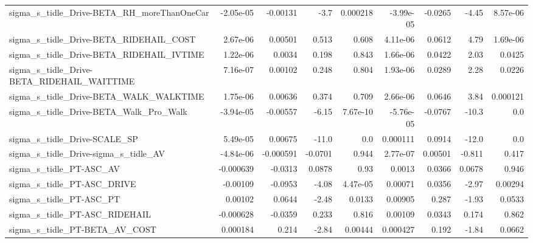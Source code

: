 \begin{tabular}{lrrrrrrrr}
sigma\_s\_tidle\_Drive-BETA\_RH\_moreThanOneCar         &   -2.05e-05 &     -0.00131 &      -3.7 & 0.000218 &  -3.99e-05 &     -0.0265 &        -4.45 &      8.57e-06 \\
sigma\_s\_tidle\_Drive-BETA\_RIDEHAIL\_COST             &    2.67e-06 &      0.00501 &     0.513 &    0.608 &   4.11e-06 &      0.0612 &         4.79 &      1.69e-06 \\
sigma\_s\_tidle\_Drive-BETA\_RIDEHAIL\_IVTIME           &    1.22e-06 &       0.0034 &     0.198 &    0.843 &   1.66e-06 &      0.0422 &         2.03 &        0.0425 \\
sigma\_s\_tidle\_Drive-BETA\_RIDEHAIL\_WAITTIME         &    7.16e-07 &      0.00102 &     0.248 &    0.804 &   1.93e-06 &      0.0289 &         2.28 &        0.0226 \\
sigma\_s\_tidle\_Drive-BETA\_WALK\_WALKTIME             &    1.75e-06 &      0.00636 &     0.374 &    0.709 &   2.66e-06 &      0.0646 &         3.84 &      0.000121 \\
sigma\_s\_tidle\_Drive-BETA\_Walk\_Pro\_Walk             &   -3.94e-05 &     -0.00557 &     -6.15 & 7.67e-10 &  -5.76e-05 &     -0.0767 &        -10.3 &           0.0 \\
sigma\_s\_tidle\_Drive-SCALE\_SP                       &    5.49e-05 &      0.00675 &     -11.0 &      0.0 &   0.000111 &      0.0914 &        -12.0 &           0.0 \\
sigma\_s\_tidle\_Drive-sigma\_s\_tidle\_AV               &   -4.84e-06 &    -0.000591 &   -0.0701 &    0.944 &   2.77e-07 &     0.00501 &       -0.811 &         0.417 \\
sigma\_s\_tidle\_PT-ASC\_AV                            &   -0.000639 &      -0.0313 &    0.0878 &     0.93 &     0.0013 &      0.0366 &       0.0678 &         0.946 \\
sigma\_s\_tidle\_PT-ASC\_DRIVE                         &    -0.00109 &      -0.0953 &     -4.08 & 4.47e-05 &    0.00071 &      0.0356 &        -2.97 &       0.00294 \\
sigma\_s\_tidle\_PT-ASC\_PT                            &     0.00102 &       0.0644 &     -2.48 &   0.0133 &    0.00905 &       0.287 &        -1.93 &        0.0533 \\
sigma\_s\_tidle\_PT-ASC\_RIDEHAIL                      &   -0.000628 &      -0.0359 &     0.233 &    0.816 &    0.00109 &      0.0343 &        0.174 &         0.862 \\
sigma\_s\_tidle\_PT-BETA\_AV\_COST                      &    0.000184 &        0.214 &     -2.84 &  0.00444 &   0.000427 &       0.192 &        -1.84 &        0.0662 \\

\end{tabular}
